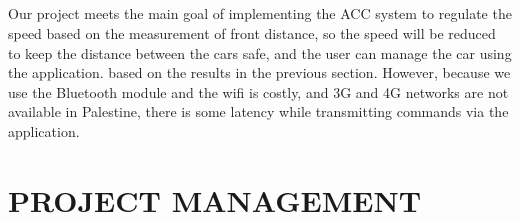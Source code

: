 \documentclass[12pt,a4paper]{report}
\begin{document}
\section{\fontsize{12}{12}\selectfont{Discussions}}
 Our project meets the main goal of implementing the ACC system to regulate the speed based on the measurement of front distance, so the speed will be reduced to keep the distance between the cars safe, and the user can manage the car using the application. based on the results in the previous section.
However, because we use the Bluetooth module and the wifi is costly, and 3G and 4G networks are not available in Palestine, there is some latency while transmitting commands via the application.



\chapter{PROJECT MANAGEMENT}
\section{\fontsize{12}{12}\selectfont{Tasks, Schedule and Milestones}}
\end{document}
